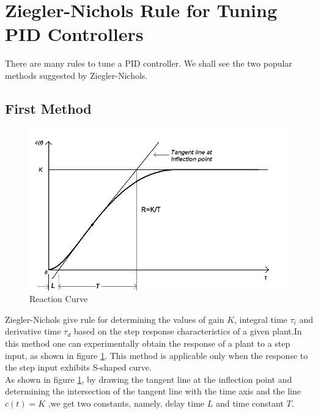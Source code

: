 \section{Ziegler-Nichols Rule for Tuning PID Controllers}
There are many rules to tune a PID controller. We shall see the two popular methods suggested by Ziegler-Nichols.
\subsection{First Method}
\begin{figure}
\centering
\includegraphics[width=\linewidth]{pid_manual/ReacCurve}
\caption{Reaction Curve\cite{kmmdc09}}
\label{RC}
\end{figure}
Ziegler-Nichols give rule for determining the values of gain $K$, integral time $\tau_i$ and derivative time $\tau_d$ based on the step response characteristics of a given plant.In this method one can experimentally obtain the response of a plant to a step input, as shown in figure \ref{RC}. This method is applicable only when the response to the step input exhibits S-shaped curve.\cite{ogt05}\\
As shown in figure \ref{RC}, by drawing the tangent line at the inflection point and determining the intersection of the tangent line with the time axis and the line $c(t)= K$ ,we get two constants, namely, delay time $L$ and time constant $T$.

